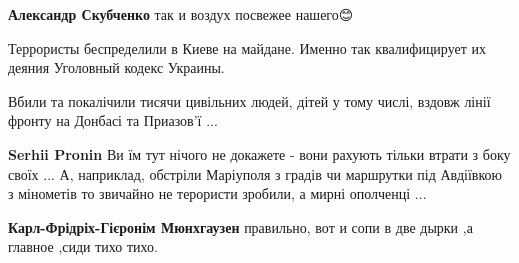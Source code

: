\begin{itemize}
\begin{itemize}
 
\textbf{Александр Скубченко} так и воздух посвежее нашего😊
\end{itemize}

 
Террористы беспределили в Киеве на майдане. Именно так квалифицирует их деяния
Уголовный кодекс Украины.


 

Вбили та покалічили тисячи цивільних людей, дітей у тому числі, вздовж лінії
фронту на Донбасі та Приазов’ї ...

\begin{itemize}
 
\textbf{Serhii Pronin} Ви їм тут нічого не докажете - вони рахують тільки втрати з боку своїх ... А, наприклад, обстріли Маріуполя з градів чи маршрутки під Авдіївкою з мінометів то звичайно не терористи зробили, а мирні ополченці ...

 
\textbf{Карл-Фрідріх-Гієронім Мюнхгаузен} правильно, вот и сопи в две дырки ,а главное ,сиди тихо тихо.

 

\end{itemize}
\end{itemize}
